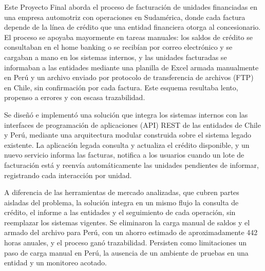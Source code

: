 \begin{resumen}

Este Proyecto Final aborda el proceso de facturación de unidades financiadas en una empresa automotriz con operaciones en Sudamérica, donde cada factura depende de la línea de crédito que una entidad financiera otorga al concesionario. El proceso se apoyaba mayormente en tareas manuales: los saldos de crédito se consultaban en el home banking o se recibían por correo electrónico y se cargaban a mano en los sistemas internos, y las unidades facturadas se informaban a las entidades mediante una planilla de Excel armada manualmente en Perú y un archivo enviado por protocolo de transferencia de archivos (FTP) en Chile, sin confirmación por cada factura. Este esquema resultaba lento, propenso a errores y con escasa trazabilidad.

Se diseñó e implementó una solución que integra los sistemas internos con las interfaces de programación de aplicaciones (API) REST de las entidades de Chile y Perú, mediante una arquitectura modular construida sobre el sistema legado existente. La aplicación legada consulta y actualiza el crédito disponible, y un nuevo servicio informa las facturas, notifica a los usuarios cuando un lote de facturación está y reenvía automáticamente las unidades pendientes de informar, registrando cada interacción por unidad.

A diferencia de las herramientas de mercado analizadas, que cubren partes aisladas del problema, la solución integra en un mismo flujo la consulta de crédito, el informe a las entidades y el seguimiento de cada operación, sin reemplazar los sistemas vigentes. Se eliminaron la carga manual de saldos y el armado del archivo para Perú, con un ahorro estimado de aproximadamente 442 horas anuales, y el proceso ganó trazabilidad. Persisten como limitaciones un paso de carga manual en Perú, la ausencia de un ambiente de pruebas en una entidad y un monitoreo acotado.

\end{resumen}
